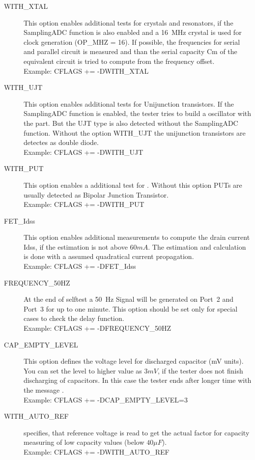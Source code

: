 \begin{description}
  \item[WITH\_XTAL]
This option enables additional tests for crystals and resonators, if the SamplingADC function is also enabled and
a 16~MHz crystal is used for clock generation (OP\_MHZ = 16).
If possible, the frequencies for serial and parallel circuit is measured and than the serial capacity Cm of the
equivalent circuit is tried to compute from the frequency offset.\\
Example: CFLAGS += -DWITH\_XTAL

  \item[WITH\_UJT]
This option enables additional tests for  Unijunction transistors. 
If the SamplingADC function is enabled, the tester tries to build a oscillator with the part.
But the UJT type is also detected without the SamplingADC function.
Without the option WITH\_UJT the unijunction transistors are detectes as double diode.\\
Example: CFLAGS += -DWITH\_UJT

  \item[WITH\_PUT]
  This option enables a additional test for .
Without this option PUTs are usually detected as Bipolar Junction Transistor.\\
Example: CFLAGS += -DWITH\_PUT

 \item[FET\_Idss]
This option enables additional measurements to compute the drain current Idss, if the estimation is not
above \(60mA\). The estimation and calculation is done with a assumed quadratical current propagation.\\
Example: CFLAGS += -DFET\_Idss

  \item[FREQUENCY\_50HZ] At the end of selftest a 50~Hz Signal will be generated on Port~2 and Port~3 for up to one minute.
 This option should be set only for special cases to check the delay function.\\
Example: CFLAGS += -DFREQUENCY\_50HZ

  \item[CAP\_EMPTY\_LEVEL]  This option defines the voltage level for discharged capacitor (mV units).
You can set the level to higher value as \(3mV\), if the tester does not finish discharging of capacitors.
In this case the tester ends after longer time with the message .\\
Example: CFLAGS += -DCAP\_EMPTY\_LEVEL=3

  \item[WITH\_AUTO\_REF] specifies, that reference voltage is read to get the actual factor for capacity measuring of low capacity values (below \(40\mu F\)).\\
Example:  CFLAGS += -DWITH\_AUTO\_REF


\end{description}
